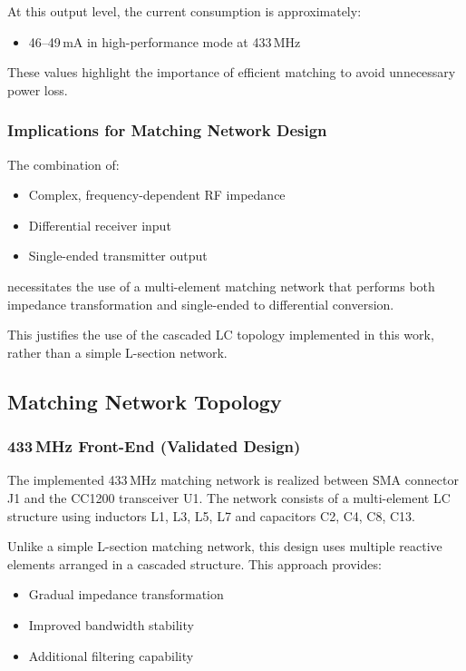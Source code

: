 At this output level, the current consumption is approximately:

\begin{itemize}
    \item 46--49\,mA in high-performance mode at 433\,MHz
\end{itemize}

These values highlight the importance of efficient matching to avoid unnecessary power loss. \cite{cc1200_datasheet}

\subsubsection{Implications for Matching Network Design}

The combination of:
\begin{itemize}
    \item Complex, frequency-dependent RF impedance
    \item Differential receiver input
    \item Single-ended transmitter output
\end{itemize}

necessitates the use of a multi-element matching network that performs both impedance transformation and single-ended to differential conversion.

This justifies the use of the cascaded LC topology implemented in this work, rather than a simple L-section network.

\subsection{Matching Network Topology}

\subsubsection{433\,MHz Front-End (Validated Design)}

The implemented 433\,MHz matching network is realized between SMA connector J1 and the CC1200 transceiver U1. The network consists of a multi-element LC structure using inductors L1, L3, L5, L7 and capacitors C2, C4, C8, C13.

Unlike a simple L-section matching network, this design uses multiple reactive elements arranged in a cascaded structure. This approach provides:
\begin{itemize}
    \item Gradual impedance transformation
    \item Improved bandwidth stability
    \item Additional filtering capability
\end{itemize}

